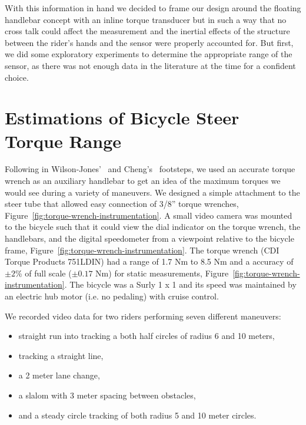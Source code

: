 \documentclass[10pt]{article}
\begin{document}

With this information in hand we decided to frame our design around the
floating handlebar concept with an inline torque transducer but in such a way
that no cross talk could affect the measurement and the inertial effects of the
structure between the rider's hands and the sensor were properly accounted for.
But first, we did some exploratory experiments to determine the appropriate
range of the sensor, as there was not enough data in the literature at the time
for a confident choice.

\section*{Estimations of Bicycle Steer Torque Range}

Following in Wilson-Jones'~\cite{Wilson-Jones1951} and Cheng’s~\cite{Cheng2003}
footsteps, we used an accurate torque wrench as an auxiliary handlebar to get
an idea of the maximum torques we would see during a variety of maneuvers. We
designed a simple attachment to the steer tube that allowed easy connection of
3/8'' torque wrenches, Figure~\ref{fig:torque-wrench-instrumentation}. A small
video camera was mounted to the bicycle such that it could view the dial
indicator on the torque wrench, the handlebars, and the digital speedometer
from a viewpoint relative to the bicycle frame,
Figure~\ref{fig:torque-wrench-instrumentation}.  The torque wrench (CDI Torque
Products 751LDIN) had a range of 1.7 Nm to 8.5 Nm and a accuracy of $\pm2$\% of
full scale ($\pm0.17$ Nm) for static measurements,
Figure~\ref{fig:torque-wrench-instrumentation}. The bicycle was a Surly 1 x 1
and its speed was maintained by an electric hub motor (i.e. no pedaling) with
cruise control.

We recorded video data for two riders performing seven different maneuvers:

\begin{itemize}
  \item straight run into tracking a both half circles of radius 6 and 10
    meters,
  \item tracking a straight line,
  \item a 2 meter lane change,
  \item a slalom with 3 meter spacing between obstacles,
  \item and a steady circle tracking of both radius 5 and 10 meter circles.
\end{itemize}
\end{document}
